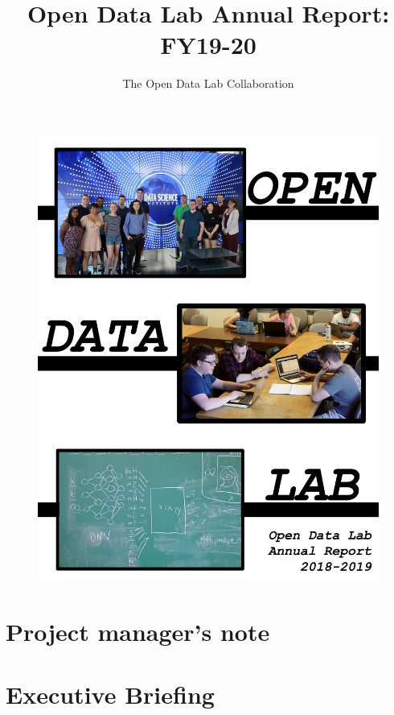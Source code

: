 \documentclass[12pt,letterpaper]{book} %
\title{Open Data Lab Annual Report: FY19-20}
\author{The Open Data Lab Collaboration}
\begin{document}
\pagestyle{headings}

\frontmatter
\cleardoublepage
\maketitle

\cleardoublepage
\begin{figure}[!hbtp]
\includegraphics[width=\textwidth]{cover-images/ODLFrontCover-nontrans}
\end{figure}

\newpage



\chapter{Project manager's note}   %
\chapter{Executive Briefing}
\end{document}
